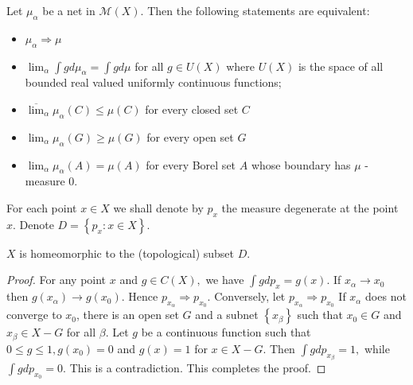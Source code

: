 \begin{thm}
	Let \( \mu _ { \alpha } \) be a net in \( \mathscr { M } ( X ) . \) Then the following statements are equivalent:
	\begin{itemize}
		\label{thm:weak_convergence}
		\item \( \mu _ { \alpha } \Rightarrow \mu \)
		\item \( \lim _ { \alpha } \int g d \mu _ { \alpha } = \int g d \mu \) for all \( g \in U ( X ) \) where \( U ( X ) \) is the space of all bounded real valued uniformly continuous functions;
		\item \( \overline { \lim } _ { \alpha } \mu _ { \alpha } ( C ) \leqslant \mu ( C ) \) for every closed set \( C \)
		\item \( \lim _ { \alpha } \mu _ { \alpha } ( G ) \geqslant \mu ( G ) \) for every open set \( G \)
		\item \( \lim _ { \alpha } \mu _ { \alpha } ( A ) = \mu ( A ) \) for every Borel set \( A \) whose boundary has \( \mu \) -measure \( 0 . \)
	\end{itemize}
\end{thm}

For each point \( x \in X \) we shall denote by \( p _ { x } \) the measure degenerate at the point \( x \). Denote \( D = \left\{ p _ { x }: x \in X \right\} \).

\begin{lem}
	\label{dirac_measure_weak_homeomorphic}
	\( X \) is homeomorphic to the (topological) subset $D$.
\end{lem}

\begin{proof}
	For any point \( x \) and \( g \in C ( X ) , \) we have \( \int g d p _ { x } = g ( x ) \). If \( x _ { \alpha } \rightarrow x _ { 0 } \) then \( g \left( x _ { \alpha } \right) \rightarrow g \left( x _ { 0 } \right) . \) Hence \( p _ { x _ { \alpha } } \Rightarrow p _ { x _ { 0 } } \). Conversely, let \( p _ { x _ { \alpha } } \Rightarrow p _ { x _ { 0 } } \) If \( x _ { \alpha } \) does not converge to \( x _ { 0 } \), there is an open set \( G \) and a subnet \( \left\{ x _ { \beta } \right\} \) such that \( x _ { 0 } \in G \) and \( x _ { \beta } \in X - G \) for all \( \beta . \) Let \( g \) be a continuous function such that \( 0 \leqslant g \leqslant 1 , g \left( x _ { 0 } \right) = 0 \) and \( g ( x ) = 1 \) for \( x \in X - G \). Then \( \int g d p _ { x _ { \beta } } = 1 , \) while \( \int g d p _ { x _ { 0 } } = 0 . \) This is a contradiction. This completes the proof.
\end{proof}

